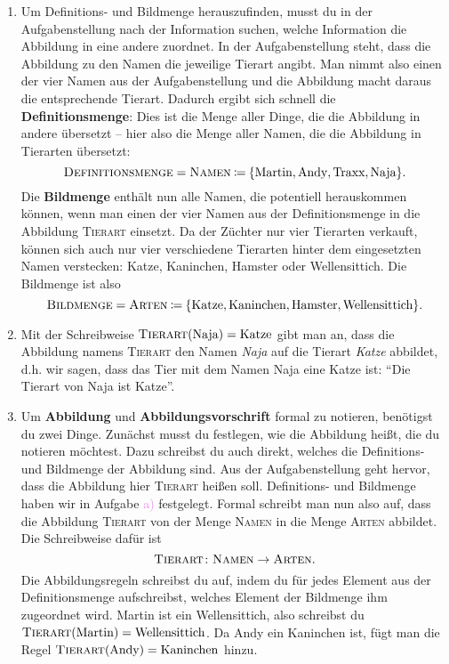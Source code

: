 \documentclass[../funktionen.tex]{subfiles}
\begin{document}
    \begin{solution}
        \begin{enumerate}
            \item Um Definitions- und Bildmenge herauszufinden, musst du in der Aufgabenstellung nach der Information suchen, welche Information die Abbildung in eine andere zuordnet. In der Aufgabenstellung steht, dass die Abbildung zu den Namen die jeweilige Tierart angibt. Man nimmt also einen der vier Namen aus der Aufgabenstellung und die Abbildung macht daraus die entsprechende Tierart. Dadurch ergibt sich schnell die \textbf{Definitionsmenge}: Dies ist die Menge aller Dinge, die die Abbildung in andere übersetzt -- hier also die Menge aller Namen, die die Abbildung in Tierarten übersetzt:
            \[\textsc{Definitionsmenge}=\textsc{Namen}\mathbin{\coloneqq}\{\text{Martin}, \text{Andy}, \text{Traxx}, \text{Naja}\}.\]
            Die \textbf{Bildmenge} enthält nun alle Namen, die potentiell herauskommen können, wenn man einen der vier Namen aus der Definitionsmenge in die Abbildung \textsc{Tierart} einsetzt. Da der Züchter nur vier Tierarten verkauft, können sich auch nur vier verschiedene Tierarten hinter dem eingesetzten Namen verstecken: Katze, Kaninchen, Hamster oder Wellensittich. Die Bildmenge ist also
            \[\textsc{Bildmenge}=\textsc{Arten}\mathbin{\coloneqq}\{\text{Katze}, \text{Kaninchen}, \text{Hamster}, \text{Wellensittich}\}.\]
            
            \item Mit der Schreibweise $\textsc{Tierart}(\text{Naja})=\text{Katze}$ gibt man an, dass die Abbildung namens \textsc{Tierart} den Namen \emph{Naja} auf die Tierart \emph{Katze} abbildet, d.h. wir sagen, dass das Tier mit dem Namen Naja eine Katze ist: \enquote{Die Tierart von Naja ist Katze}.
            
            \item Um \textbf{Abbildung} und \textbf{Abbildungsvorschrift} formal zu notieren, benötigst du zwei Dinge. Zunächst musst du festlegen, wie die Abbildung heißt, die du notieren möchtest. Dazu schreibst du auch direkt, welches die Definitions- und Bildmenge der Abbildung sind. Aus der Aufgabenstellung geht hervor, dass die Abbildung hier \textsc{Tierart} heißen soll. Definitions- und Bildmenge haben wir in Aufgabe \textcolor{violet}{a)} festgelegt. Formal schreibt man nun also auf, dass die Abbildung \textsc{Tierart} von der Menge \textsc{Namen} in die Menge \textsc{Arten} abbildet. Die Schreibweise dafür ist
            \[\textsc{Tierart}\colon\textsc{Namen}\rightarrow\textsc{Arten}.\]
            Die Abbildungsregeln schreibst du auf, indem du für jedes Element aus der Definitionsmenge aufschreibst, welches Element der Bildmenge ihm zugeordnet wird. Martin ist ein Wellensittich, also schreibst du $\textsc{Tierart}(\text{Martin})=\text{Wellensittich}$. Da Andy ein Kaninchen ist, fügt man die Regel $\textsc{Tierart}(\text{Andy})=\text{Kaninchen}$ hinzu.
            

\end{enumerate}
\end{solution}
\end{document}
